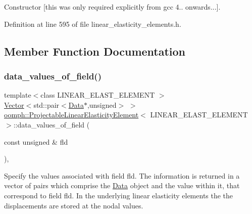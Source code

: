 Constructor \mbox{[}this was only required explicitly from gcc 4.. onwards...\mbox{]}. 



Definition at line 595 of file linear\+\_\+elasticity\+\_\+elements.\+h.



\subsection{Member Function Documentation}
\mbox{\label{classoomph_1_1ProjectableLinearElasticityElement_ab73155dc46dafbc35a71a36c855f5790}} 
\subsubsection{\texorpdfstring{data\+\_\+values\+\_\+of\+\_\+field()}{data\_values\_of\_field()}}
{\footnotesize\ttfamily template$<$class L\+I\+N\+E\+A\+R\+\_\+\+E\+L\+A\+S\+T\+\_\+\+E\+L\+E\+M\+E\+NT $>$ \\
\hyperlink{classoomph_1_1Vector}{Vector}$<$std\+::pair$<$\hyperlink{classoomph_1_1Data}{Data}$\ast$,unsigned$>$ $>$ \hyperlink{classoomph_1_1ProjectableLinearElasticityElement}{oomph\+::\+Projectable\+Linear\+Elasticity\+Element}$<$ L\+I\+N\+E\+A\+R\+\_\+\+E\+L\+A\+S\+T\+\_\+\+E\+L\+E\+M\+E\+NT $>$\+::data\+\_\+values\+\_\+of\+\_\+field (\begin{DoxyParamCaption}\item[{const unsigned \&}]{fld }\end{DoxyParamCaption})\hspace{0.3cm}{\ttfamily [inline]}, {\ttfamily [virtual]}}



Specify the values associated with field fld. The information is returned in a vector of pairs which comprise the \hyperlink{classoomph_1_1Data}{Data} object and the value within it, that correspond to field fld. In the underlying linear elasticity elements the the displacements are stored at the nodal values. 



